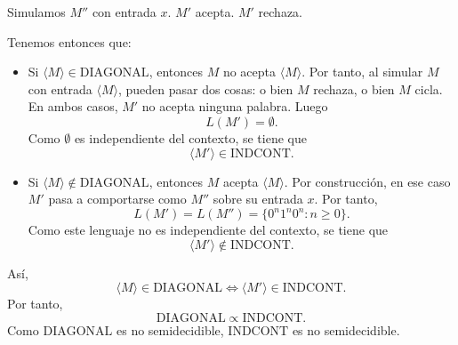 \begin{ejercicio}
\begin{itemize}
\begin{algorithm}
\begin{algorithmic}
                    \State Simulamos $M''$ con entrada $x$.
                        \State $M'$ acepta.
                    \Else
                        \State $M'$ rechaza.
                    \EndIf
                \EndIf
            \end{algorithmic}
        \end{algorithm}

        Tenemos entonces que:

        \begin{itemize}
            \item Si $\langle M\rangle \in \text{DIAGONAL}$, entonces $M$ no acepta
                $\langle M\rangle$. Por tanto, al simular $M$ con entrada $\langle M\rangle$,
                pueden pasar dos cosas: o bien $M$ rechaza, o bien $M$ cicla. En ambos casos,
                $M'$ no acepta ninguna palabra. Luego $$L(M')=\emptyset.$$
                Como $\emptyset$ es independiente del contexto, se tiene que
                $$\langle M'\rangle \in \text{INDCONT}.$$
            \item Si $\langle M\rangle \notin \text{DIAGONAL}$, entonces $M$ acepta
                $\langle M\rangle$. Por construcción, en ese caso $M'$ pasa a comportarse como
                $M''$ sobre su entrada $x$. Por tanto, $$L(M')=L(M'')=\{0^n1^n0^n : n\geq 0\}.$$
                Como este lenguaje no es independiente del contexto, se tiene que
                $$\langle M'\rangle \notin \text{INDCONT}.$$
        \end{itemize}

        Así, $$\langle M\rangle \in \text{DIAGONAL} \Longleftrightarrow \langle M'\rangle \in \text{INDCONT}.$$
        Por tanto, $$ \text{DIAGONAL} \propto \text{INDCONT}.$$
        Como $\text{DIAGONAL}$ es no semidecidible, $\text{INDCONT}$ es no semidecidible.
    \end{itemize}
\end{ejercicio}




